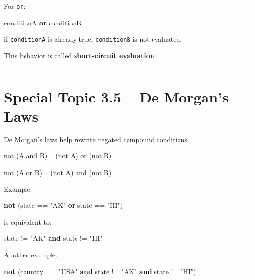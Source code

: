 \documentclass[
  11pt,
  a4paper,
]{article}
\newenvironment{Shaded}{}{}
\newcommand{\KeywordTok}[1]{\textcolor[rgb]{0.00,0.44,0.13}{\textbf{#1}}}
\newcommand{\NormalTok}[1]{#1}
\newcommand{\OperatorTok}[1]{\textcolor[rgb]{0.40,0.40,0.40}{#1}}
\newcommand{\StringTok}[1]{\textcolor[rgb]{0.25,0.44,0.63}{#1}}
\begin{document}
For \texttt{or}:

\begin{Shaded}
\begin{Highlighting}[]
\NormalTok{conditionA }\KeywordTok{or}\NormalTok{ conditionB}
\end{Highlighting}
\end{Shaded}

if \texttt{conditionA} is already true, \texttt{conditionB} is not
evaluated.

This behavior is called \textbf{short-circuit evaluation}.

\begin{center}\rule{0.5\linewidth}{0.5pt}\end{center}

\section{Special Topic 3.5 -- De Morgan's
Laws}\label{special-topic-3.5-de-morgans-laws}

De Morgan's laws help rewrite negated compound conditions.

\begin{Shaded}
\begin{Highlighting}[]
\NormalTok{not (A and B)  ≡  (not A) or (not B)}

\NormalTok{not (A or B)   ≡  (not A) and (not B)}
\end{Highlighting}
\end{Shaded}

Example:

\begin{Shaded}
\begin{Highlighting}[]
\KeywordTok{not}\NormalTok{ (state }\OperatorTok{==} \StringTok{"AK"} \KeywordTok{or}\NormalTok{ state }\OperatorTok{==} \StringTok{"HI"}\NormalTok{)}
\end{Highlighting}
\end{Shaded}

is equivalent to:

\begin{Shaded}
\begin{Highlighting}[]
\NormalTok{state }\OperatorTok{!=} \StringTok{"AK"} \KeywordTok{and}\NormalTok{ state }\OperatorTok{!=} \StringTok{"HI"}
\end{Highlighting}
\end{Shaded}

Another example:

\begin{Shaded}
\begin{Highlighting}[]
\KeywordTok{not}\NormalTok{ (country }\OperatorTok{==} \StringTok{"USA"} \KeywordTok{and}\NormalTok{ state }\OperatorTok{!=} \StringTok{"AK"} \KeywordTok{and}\NormalTok{ state }\OperatorTok{!=} \StringTok{"HI"}\NormalTok{)}
\end{Highlighting}
\end{Shaded}
\end{document}
